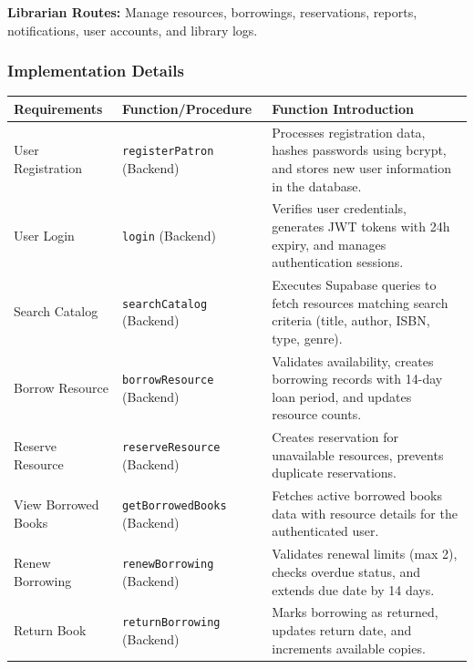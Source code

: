 \documentclass[11pt,a4paper]{article}
\begin{document}
\textbf{Librarian Routes:} Manage resources, borrowings, reservations, reports, notifications, user accounts, and library logs.

\subsubsection{Implementation Details}

\begin{longtable}{@{}p{3cm}p{4cm}p{6cm}@{}}
\toprule
\textbf{Requirements} & \textbf{Function/Procedure} & \textbf{Function Introduction} \\
\midrule
\endhead

User Registration & \texttt{registerPatron} (Backend) & Processes registration data, hashes passwords using bcrypt, and stores new user information in the database. \\
\midrule

User Login & \texttt{login} (Backend) & Verifies user credentials, generates JWT tokens with 24h expiry, and manages authentication sessions. \\
\midrule

Search Catalog & \texttt{searchCatalog} (Backend) & Executes Supabase queries to fetch resources matching search criteria (title, author, ISBN, type, genre). \\
\midrule

Borrow Resource & \texttt{borrowResource} (Backend) & Validates availability, creates borrowing records with 14-day loan period, and updates resource counts. \\
\midrule

Reserve Resource & \texttt{reserveResource} (Backend) & Creates reservation for unavailable resources, prevents duplicate reservations. \\
\midrule

View Borrowed Books & \texttt{getBorrowedBooks} (Backend) & Fetches active borrowed books data with resource details for the authenticated user. \\
\midrule

Renew Borrowing & \texttt{renewBorrowing} (Backend) & Validates renewal limits (max 2), checks overdue status, and extends due date by 14 days. \\
\midrule

Return Book & \texttt{returnBorrowing} (Backend) & Marks borrowing as returned, updates return date, and increments available copies. \\
\midrule


\end{longtable}
\end{document}
